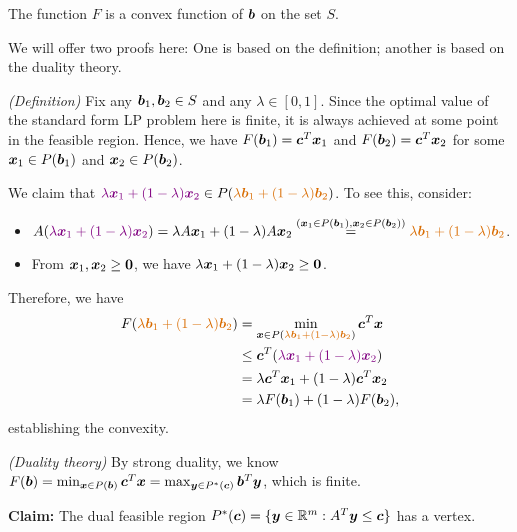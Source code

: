 \begin{enumerate}
\begin{theorem}
\label{thm:F-cvx}
The function \(F\) is a convex function of \(\bm{b}\) on the set \(S\).
\end{theorem}
We will offer two proofs here: One is based on the definition; another is
based on the duality theory.

\begin{pf}
\emph{(Definition)}
Fix any \(\bm{b}_1,\bm{b}_2\in S\) and any \(\lambda\in[0,1]\). Since the
optimal value of the standard form LP problem here is finite, it is always
achieved at some point in the feasible region. Hence, we have
\(F(\bm{b}_1)=\bm{c}^{T}\bm{x}_1\) and
\(F(\bm{b}_2)=\bm{c}^{T}\bm{x}_2\) for some \(\bm{x}_1\in
P(\bm{b}_1)\) and \(\bm{x}_2\in P(\bm{b}_2)\).

We claim that \(\vc{\lambda\vect{x}_1+(1-\lambda)\vect{x}_2}\in
P(\orc{\lambda\vect{b}_1+(1-\lambda)\vect{b}_2})\). To see this, consider:
\begin{itemize}
\item \(A(\vc{\lambda\vect{x}_1+(1-\lambda)\vect{x}_2})
=\lambda A\vect{x}_1+(1-\lambda)A\vect{x}_2
\overset{(\vect{x}_1\in P(\vect{b}_1), \vect{x}_2\in P(\vect{b}_2))}{=}\orc{\lambda\vect{b}_1+(1-\lambda)\vect{b}_2}\).
\item From \(\bm{x}_1,\bm{x}_2\ge \bm{0}\), we have \(\lambda\bm{x}_1+(1-\lambda)\bm{x}_2\ge\bm{0}\).
\end{itemize}
Therefore, we have
\begin{align*}
F(\orc{\lambda\vect{b}_1+(1-\lambda)\vect{b}_2})
&=\min_{\vect{x}\in P(\orc{\lambda\vect{b}_1+(1-\lambda)\vect{b}_2})}\vect{c}^{T}\vect{x} \\
&\le\vect{c}^{T}(\vc{\lambda\vect{x}_1+(1-\lambda)\vect{x}_2}) \\
&=\lambda\vect{c}^{T}\vect{x}_1+(1-\lambda)\vect{c}^{T}\vect{x}_2 \\
&=\lambda F(\vect{b}_{1})+(1-\lambda)F(\vect{b}_{2}),
\end{align*}
establishing the convexity.
\end{pf}

\begin{pf}
\emph{(Duality theory)}
By strong duality, we know \(F(\bm{b})=\min_{\bm{x}\in P(\bm{b})}\bm{c}^{T}\bm{x}
=\max_{\bm{y}\in P^*(\bm{c})}\bm{b}^{T}\bm{y}\), which is finite.

\textbf{Claim:} The dual feasible region
\(P^*(\bm{c})=\{\bm{y}\in\mathbb{R}^m:A^{T}\bm{y}\le\bm{c}\}\) has a vertex.


\end{pf}
\end{enumerate}
